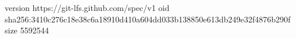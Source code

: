 version https://git-lfs.github.com/spec/v1
oid sha256:3410c276c18e38c6a18910d410a604dd033b138850e613db249e32f4876b290f
size 5592544
